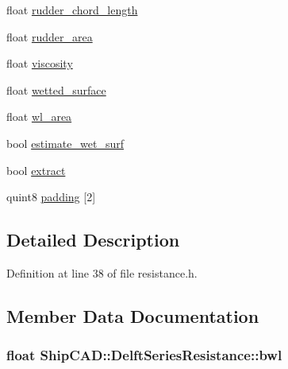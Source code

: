 \begin{DoxyCompactItemize}
\item 
float \hyperlink{structShipCAD_1_1DelftSeriesResistance_a5a348a92e0ba99368c50f72c81a9b0ff}{rudder\+\_\+chord\+\_\+length}
\item 
float \hyperlink{structShipCAD_1_1DelftSeriesResistance_a9737974d43a292c58a2e24f7c78c1ffb}{rudder\+\_\+area}
\item 
float \hyperlink{structShipCAD_1_1DelftSeriesResistance_a08ff900d51b56d7e1726cb4b5a6ffa9b}{viscosity}
\item 
float \hyperlink{structShipCAD_1_1DelftSeriesResistance_a7ee0a7e2d05634beb7fb9951d80c7557}{wetted\+\_\+surface}
\item 
float \hyperlink{structShipCAD_1_1DelftSeriesResistance_af51e72b70af1ce87cf7ac641df93c541}{wl\+\_\+area}
\item 
bool \hyperlink{structShipCAD_1_1DelftSeriesResistance_a0507b03a9329185d961cd97739237d91}{estimate\+\_\+wet\+\_\+surf}
\item 
bool \hyperlink{structShipCAD_1_1DelftSeriesResistance_a8276aa04952e727f1a310f10ceb72414}{extract}
\item 
quint8 \hyperlink{structShipCAD_1_1DelftSeriesResistance_acd08ff15cfab748bf4f54aa65b927950}{padding} \mbox{[}2\mbox{]}
\end{DoxyCompactItemize}


\subsection{Detailed Description}


Definition at line 38 of file resistance.\+h.



\subsection{Member Data Documentation}
\subsubsection[{\texorpdfstring{bwl}{bwl}}]{\setlength{\rightskip}{0pt plus 5cm}float Ship\+C\+A\+D\+::\+Delft\+Series\+Resistance\+::bwl}\hypertarget{structShipCAD_1_1DelftSeriesResistance_a160c7b99be523bcda5301231806af6b3}{}\label{structShipCAD_1_1DelftSeriesResistance_a160c7b99be523bcda5301231806af6b3}



